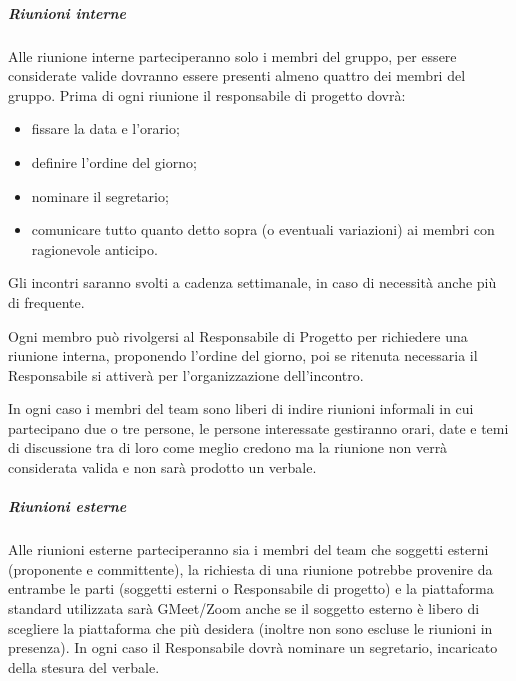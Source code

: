 \subparagraph{Riunioni interne}
Alle riunione interne parteciperanno solo i membri del gruppo, per essere considerate valide dovranno essere presenti almeno quattro dei membri del gruppo. Prima di ogni riunione il responsabile di progetto dovrà:
\begin{itemize}
\item fissare la data e l'orario;
\item definire l'ordine del giorno;
\item nominare il segretario;
\item comunicare tutto quanto detto sopra (o eventuali variazioni) ai membri con ragionevole anticipo.
\end{itemize}
Gli incontri saranno svolti a cadenza settimanale, in caso di necessità anche più di frequente.

Ogni membro può rivolgersi al Responsabile di Progetto per richiedere una riunione interna, proponendo l'ordine del giorno, poi se ritenuta necessaria il Responsabile si attiverà per l'organizzazione dell'incontro.

In ogni caso i membri del team sono liberi di indire riunioni informali in cui partecipano due o tre persone, le persone interessate gestiranno orari, date e temi di discussione tra di loro come meglio credono ma la riunione non verrà considerata valida e non sarà prodotto un verbale.

\subparagraph{Riunioni esterne}
Alle riunioni esterne parteciperanno sia i membri del team che soggetti esterni (proponente e committente), la richiesta di una riunione potrebbe provenire da entrambe le parti (soggetti esterni o Responsabile di progetto) e la piattaforma standard utilizzata sarà GMeet/Zoom anche se il soggetto esterno è libero di scegliere la piattaforma che più desidera (inoltre non sono escluse le riunioni in presenza). In ogni caso il Responsabile dovrà nominare un segretario, incaricato della stesura del verbale.
